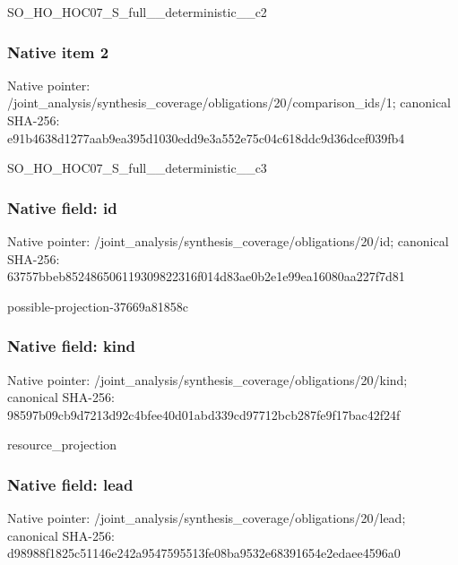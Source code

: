 \documentclass[10pt,a4paper]{article}
\begin{document}
\begingroup\raggedright\sloppy SO\_\allowbreak{}HO\_\allowbreak{}HOC07\_\allowbreak{}S\_\allowbreak{}full\_\allowbreak{}\_\allowbreak{}deterministic\_\allowbreak{}\_\allowbreak{}c2\par\endgroup

\subsubsection{Native item 2}
Native pointer: /joint\_\allowbreak{}analysis/synthesis\_\allowbreak{}coverage/obligations/20/comparison\_\allowbreak{}ids/1; canonical SHA-256: e91b4638d1277aab9ea395d1030edd9e3a552e75c04c618ddc9d36dcef039fb4

\begingroup\raggedright\sloppy SO\_\allowbreak{}HO\_\allowbreak{}HOC07\_\allowbreak{}S\_\allowbreak{}full\_\allowbreak{}\_\allowbreak{}deterministic\_\allowbreak{}\_\allowbreak{}c3\par\endgroup

\subsubsection{Native field: id}
Native pointer: /joint\_\allowbreak{}analysis/synthesis\_\allowbreak{}coverage/obligations/20/id; canonical SHA-256: 63757bbeb852486506119309822316f014d83ae0b2e1e99ea16080aa227f7d81

\begingroup\raggedright\sloppy possible-projection-37669a81858c\par\endgroup

\subsubsection{Native field: kind}
Native pointer: /joint\_\allowbreak{}analysis/synthesis\_\allowbreak{}coverage/obligations/20/kind; canonical SHA-256: 98597b09cb9d7213d92c4bfee40d01abd339cd97712bcb287fe9f17bac42f24f

\begingroup\raggedright\sloppy resource\_\allowbreak{}projection\par\endgroup

\subsubsection{Native field: lead}
Native pointer: /joint\_\allowbreak{}analysis/synthesis\_\allowbreak{}coverage/obligations/20/lead; canonical SHA-256: d98988f1825c51146e242a9547595513fe08ba9532e68391654e2edaee4596a0
\end{document}

